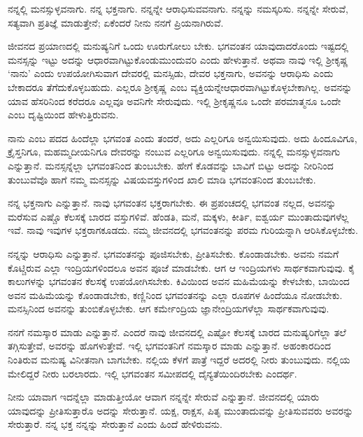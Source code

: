 \begin{artha}
ನನ್ನಲ್ಲಿ ಮನಸ್ಸುಳ್ಳವನಾಗು. ನನ್ನ ಭಕ್ತನಾಗು. ನನ್ನನ್ನೇ ಆರಾಧಿಸುವವನಾಗು. ನನ್ನನ್ನು ನಮಸ್ಕರಿಸು. ನನ್ನನ್ನೇ ಸೇರುವೆ, ಸತ್ಯವಾಗಿ ಪ್ರತಿಜ್ಞೆ ಮಾಡುತ್ತೇನೆ; ಏಕೆಂದರೆ ನೀನು ನನಗೆ ಪ್ರಿಯನಾಗಿರುವೆ.
\end{artha}

ಜೀವನದ ಪ್ರಯಾಣದಲ್ಲಿ ಮನುಷ್ಯನಿಗೆ ಒಂದು ಊರುಗೋಲು ಬೇಕು. ಭಗವಂತನ ಯಾವುದಾದರೊಂದು ಇಷ್ಟದಲ್ಲಿ ಮನಸ್ಸನ್ನು ಇಟ್ಟು ಅದನ್ನು ಆಧಾರವಾಗಿಟ್ಟುಕೊಂಡು\break ಮುಂದುವರಿ ಎಂದು ಹೇಳುತ್ತಾನೆ. ಅಥವಾ ನಾವು ಇಲ್ಲಿ ಶ‍್ರೀಕೃಷ್ಣ ‘ನಾನು’ ಎಂದು ಉಪಯೋಗಿಸುವಾಗ ದೇವರಲ್ಲಿ ಮನಸ್ಸಿಡು, ದೇವರ ಭಕ್ತನಾಗು, ಅವನನ್ನು ಆರಾಧಿಸು ಎಂದು ಬೇಕಾದರೂ ತೆಗೆದುಕೊಳ್ಳಬಹುದು. ಎಲ್ಲರೂ ಶ‍್ರೀಕೃಷ್ಣ ಎಂಬ ವ್ಯಕ್ತಿಯನ್ನೇ\break ಆಧಾರವಾಗಿಟ್ಟುಕೊಳ್ಳಬೇಕಾಗಿಲ್ಲ. ಅವನನ್ನು ಯಾವ ಹೆಸರಿನಿಂದ ಕರೆದರೂ ಎಲ್ಲವೂ ಅವನಿಗೇ ಸೇರುವುದು. ಇಲ್ಲಿ ಶ‍್ರೀಕೃಷ್ಣನೂ ಒಂದೇ ಪರಮಾತ್ಮನೂ ಒಂದೇ ಎಂಬ ದೃಷ್ಟಿಯಿಂದ ಹೇಳುತ್ತಿರುವನು.

ನಾನು ಎಂಬ ಪದದ ಹಿಂದೆಲ್ಲಾ ಭಗವಂತ ಎಂದು ತಂದರೆ, ಅದು ಎಲ್ಲರಿಗೂ ಅನ್ವಯಿಸುವುದು. ಅದು ಹಿಂದೂವಿಗೂ, ಕ್ರೈಸ್ತನಿಗೂ, ಮಹಮ್ಮದೀಯನಿಗೂ ದೇವರನ್ನು ನಂಬುವ ಎಲ್ಲರಿಗೂ ಅನ್ವಯಿಸುವುದು. ನನ್ನಲ್ಲಿ ಮನಸ್ಸುಳ್ಳವನಾಗು ಎನ್ನುತ್ತಾನೆ. ಮನಸ್ಸನ್ನೆಲ್ಲಾ ಭಗವಂತನಿಂದ ತುಂಬಬೇಕು. ಹೇಗೆ ಕೊಡವನ್ನು ಬಾವಿಗೆ ಬಿಟ್ಟು ಅದನ್ನು ನೀರಿನಿಂದ ತುಂಬುವೆವೊ ಹಾಗೆ ನಮ್ಮ ಮನಸ್ಸನ್ನು ವಿಷಯವಸ್ತುಗಳಿಂದ ಖಾಲಿ ಮಾಡಿ ಭಗವಂತನಿಂದ ತುಂಬಬೇಕು.

ನನ್ನ ಭಕ್ತನಾಗು ಎನ್ನುತ್ತಾನೆ. ನಾವು ಭಗವಂತನ ಭಕ್ತರಾಗಬೇಕು. ಈ ಪ್ರಪಂಚದಲ್ಲಿ ಭಗವಂತ ನಲ್ಲದ, ಅವನನ್ನು ಮರೆಸುವ ಎಷ್ಚೊ ಕೆಲಸಕ್ಕೆ ಬಾರದ ವಸ್ತುಗಳಿವೆ. ಹೆಂಡತಿ, ಮನೆ, ಮಕ್ಕಳು, ಕೀರ್ತಿ, ಐಶ್ವರ್ಯ ಮುಂತಾದುವುಗಳೆಲ್ಲ ಇವೆ. ನಾವು ಇವುಗಳ ಭಕ್ತರಾಗಕೂಡದು. ನಮ್ಮ ಜೀವನದಲ್ಲಿ ಭಗವಂತನನ್ನು ಪರಮ ಗುರಿಯನ್ನಾಗಿ ಆರಿಸಿಕೊಳ್ಳಬೇಕು.

ನನ್ನನ್ನು ಆರಾಧಿಸು ಎನ್ನುತ್ತಾನೆ. ಭಗವಂತನನ್ನು ಪೂಜಿಸಬೇಕು, ಪ್ರೀತಿಸಬೇಕು. ಕೊಂಡಾಡಬೇಕು. ಅವನು ನಮಗೆ ಕೊಟ್ಚಿರುವ ಎಲ್ಲಾ ಇಂದ್ರಿಯಗಳಿಂದಲೂ ಅವನ ಪೂಜೆ ಮಾಡಬೇಕು. ಆಗ ಆ ಇಂದ್ರಿಯಗಳು ಸಾರ್ಥಕವಾಗುವುವು. ಕೈ ಕಾಲುಗಳನ್ನು ಭಗವಂತನ ಕೆಲಸಕ್ಕೆ ಉಪಯೋಗಿಸಬೇಕು. ಕಿವಿಯಿಂದ ಅವನ ಮಹಿಮೆಯನ್ನು ಕೇಳಬೇಕು, ಬಾಯಿಂದ ಅವನ ಮಹಿಮೆಯನ್ನು ಕೊಂಡಾಡಬೇಕು, ಕಣ್ಣಿನಿಂದ ಭಗವಂತನನ್ನು ಎಲ್ಲಾ ರೂಪಗಳ ಹಿಂದೆಯೂ ನೋಡಬೇಕು. ಮನಸ್ಸಿನಿಂದ ಅವನನ್ನು ತುಂಬಿಕೊಳ್ಳಬೇಕು. ಆಗ ಕರ್ಮೇಂದ್ರಿಯ ಜ್ಞಾನೇಂದ್ರಿಯಗಳೆಲ್ಲಾ ಸಾರ್ಥಕವಾಗುವುವು.

ನನಗೆ ನಮಸ್ಕಾರ ಮಾಡು ಎನ್ನುತ್ತಾನೆ. ಎಂದರೆ ನಾವು ಜೀವನದಲ್ಲಿ ಎಷ್ಟೋ ಕೆಲಸಕ್ಕೆ ಬಾರದ ಮನುಷ್ಯರಿಗೆಲ್ಲಾ ತಲೆ ತಗ್ಗಿಸುತ್ತೇವೆ, ಅವರನ್ನು ಹೊಗಳುತ್ತೇವೆ. ಇಲ್ಲಿ ಭಗವಂತನಿಗೆ ನಮಸ್ಕಾರ ಮಾಡು ಎನ್ನುತ್ತಾನೆ. ಅಹಂಕಾರದಿಂದ ನಿಂತಿರುವ ಮನುಷ್ಯ ವಿನೀತನಾಗಿ ಬಾಗಬೇಕು. ನಲ್ಲಿಯ ಕೆಳಗೆ ಪಾತ್ರೆ ಇದ್ದರೆ ಅದರಲ್ಲಿ ನೀರು ತುಂಬುವುದು. ನಲ್ಲಿಯ ಮೇಲಿದ್ದರೆ ನೀರು ಬರಲಾರದು. ಇಲ್ಲಿ ಭಗವಂತನ ಸಮೀಪದಲ್ಲಿ ದೈನ್ಯತೆಯಿಂದಿರಬೇಕು ಎಂದರ್ಥ.

ನೀನು ಯಾವಾಗ ಇದನ್ನೆಲ್ಲಾ ಮಾಡುತ್ತೀಯೋ ಆವಾಗ ನನ್ನನ್ನೇ ಸೇರುವೆ ಎನ್ನುತ್ತಾನೆ. ಜೀವನದಲ್ಲಿ ಯಾರು ಯಾವುದನ್ನು ಪ್ರೀತಿಸುತ್ತಾರೊ ಅದನ್ನು ಸೇರುತ್ತಾನೆ. ಯಕ್ಷ, ರಾಕ್ಷಸ, ಪಿತೃ ಮುಂತಾದುವನ್ನು ಪ್ರೀತಿಸುವವರು ಅವರನ್ನು ಸೇರುತ್ತಾರೆ. ನನ್ನ ಭಕ್ತ ನನ್ನನ್ನು ಸೇರುತ್ತಾನೆ ಎಂದು ಹಿಂದೆ ಹೇಳಿರುವನು.

